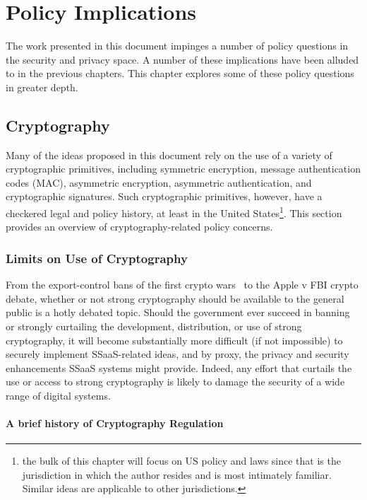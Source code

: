 \chapter{Policy Implications}
\label{chap:policy}

The work presented in this document impinges a number of policy
questions in the security and privacy space. A number of these
implications have been alluded to in the previous chapters. This
chapter explores some of these policy questions in greater depth.

\section{Cryptography}
\label{chap:policy:crypto}

Many of the ideas proposed in this document rely on the use of a
variety of cryptographic primitives, including symmetric encryption,
message authentication codes (MAC), asymmetric encryption, asymmetric
authentication, and cryptographic signatures. Such cryptographic
primitives, however, have a checkered legal and policy history, at
least in the United States\footnote{the bulk of this chapter will
  focus on US policy and laws since that is the jurisdiction in which
  the author resides and is most intimately familiar. Similar ideas
  are applicable to other jurisdictions.}. This section provides an
overview of cryptography-related policy concerns.

\subsection{Limits on Use of Cryptography}
\label{chap:policy:crypto:limits}

From the export-control bans of the first crypto wars~\cite{kehl2015}
to the Apple v FBI crypto debate, whether or not strong cryptography
should be available to the general public is a hotly debated
topic. Should the government ever succeed in banning or strongly
curtailing the development, distribution, or use of strong
cryptography, it will become substantially more difficult (if not
impossible) to securely implement SSaaS-related ideas, and by proxy,
the privacy and security enhancements SSaaS systems might
provide. Indeed, any effort that curtails the use or access to strong
cryptography is likely to damage the security of a wide range of digital
systems.

\subsubsection{A brief history of Cryptography Regulation}

